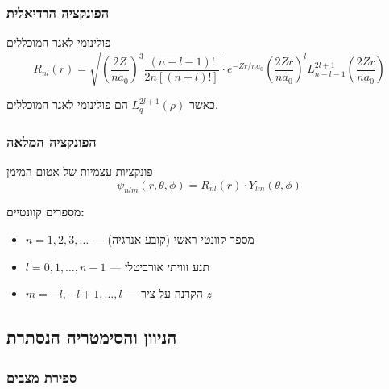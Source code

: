 \subsubsection{הפונקציה הרדיאלית}

\begin{definitionbox}{פולינומי לאגר המוכללים}
\[
R_{nl}(r) = \sqrt{\left(\frac{2Z}{na_0}\right)^3 \frac{(n-l-1)!}{2n[(n+l)!]}} \cdot e^{-Zr/na_0} \left(\frac{2Zr}{na_0}\right)^l L_{n-l-1}^{2l+1}\left(\frac{2Zr}{na_0}\right)
\]

כאשר $L_q^{2l+1}(\rho)$ הם פולינומי לאגר המוכללים.
\end{definitionbox}

\subsubsection{הפונקציה המלאה}

\begin{importantbox}{פונקציות עצמיות של אטום המימן}
\[
\psi_{nlm}(r,\theta,\phi) = R_{nl}(r) \cdot Y_{lm}(\theta,\phi)
\]

\textbf{מספרים קוונטיים:}
\begin{itemize}
    \item $n = 1, 2, 3, \ldots$ — מספר קוונטי ראשי (קובע אנרגיה)
    \item $l = 0, 1, \ldots, n-1$ — תנע זוויתי אורביטלי
    \item $m = -l, -l+1, \ldots, l$ — הקרנה על ציר $z$
\end{itemize}
\end{importantbox}

\subsection{הניוון והסימטריה הנסתרת}

\subsubsection{ספירת מצבים}

